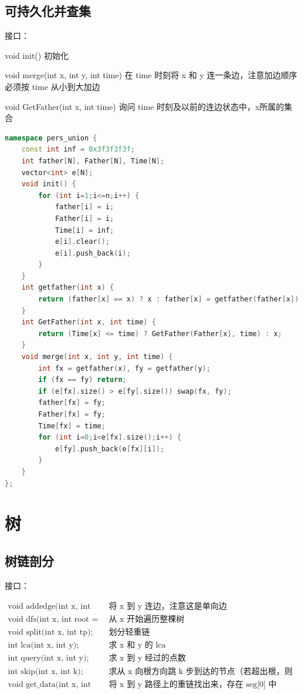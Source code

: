 \documentclass{article}
\begin{document}
\subsection{可持久化并查集}
接口：

void init() 初始化

void merge(int x, int y, int time) 在 time 时刻将 x 和 y 连一条边，注意加边顺序必须按 time 从小到大加边

void GetFather(int x, int time) 询问 time 时刻及以前的连边状态中，x所属的集合
\begin{lstlisting}[language=C++]
namespace pers_union {
	const int inf = 0x3f3f3f3f;
	int father[N], Father[N], Time[N];
	vector<int> e[N];
	void init() {
		for (int i=1;i<=n;i++) {
			father[i] = i;
			Father[i] = i;
			Time[i] = inf;
			e[i].clear();
			e[i].push_back(i);
		}
	}
	int getfather(int x) {
		return (father[x] == x) ? x : father[x] = getfather(father[x]);
	}
	int GetFather(int x, int time) {
		return (Time[x] <= time) ? GetFather(Father[x], time) : x;
	}
	void merge(int x, int y, int time) {
		int fx = getfather(x), fy = getfather(y);
		if (fx == fy) return;
		if (e[fx].size() > e[fy].size()) swap(fx, fy);
		father[fx] = fy;
		Father[fx] = fy;
		Time[fx] = time;
		for (int i=0;i<e[fx].size();i++) {
			e[fy].push_back(e[fx][i]);
		}
	}
};
\end{lstlisting}

\section{树}

\subsection{树链剖分}

接口：

$
\begin{array}{ll}
	\text{void addedge(int x, int y);} & \text{将 x 到 y 连边，注意这是单向边} \\
	\text{void dfs(int x, int root = 0);} & \text{从 x 开始遍历整棵树} \\
	\text{void split(int x, int tp);} & \text{划分轻重链} \\
	\text{int lca(int x, int y);} & \text{求 x 和 y 的 lca} \\
	\text{int query(int x, int y);} & \text{求 x 到 y 经过的点数} \\
	\text{int skip(int x, int k);} & \text{求从 x 向根方向跳 k 步到达的节点（若超出根，则返回 0）} \\
	\text{void get\_data(int x, int y);} & \text{将 x 到 y 路径上的重链找出来，存在 seg[0] 中} \\
	
\end{array}
$
\end{document}
